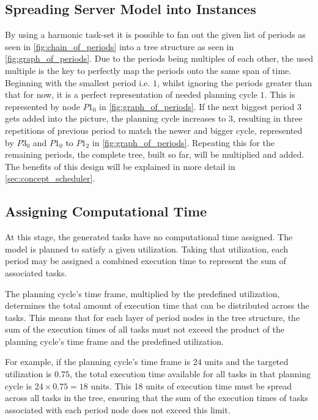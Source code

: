 \subsection{Spreading Server Model into Instances}\label{sec:spreading_server_model_into_instances}
By using a harmonic task-set it is possible to fan out the given list of periods as seen in \cref{fig:chain_of_periods} into a tree structure as seen in \cref{fig:graph_of_periods}.
Due to the periods being multiples of each other, the used multiple is the key to perfectly map the periods onto the same span of time.
Beginning with the smallest period i.e. $1$, whilst ignoring the periods greater than that for now, it is a perfect representation of needed planning cycle $1$.
This is represented by node $P1_0$ in \cref{fig:graph_of_periods}.
If the next biggest period $3$ gets added into the picture, the planning cycle increases to $3$, resulting in three repetitions of previous period to match the newer and bigger cycle, represented by $P3_0$ and $P1_0$ to $P1_2$ in \cref{fig:graph_of_periods}.
Repeating this for the remaining periods, the complete tree, built so far, will be multiplied and added.
The benefits of this design will be explained in more detail in \cref{sec:concept_scheduler}.

\subsection{Assigning Computational Time}\label{sec:concept_load_spread}
At this stage, the generated tasks have no computational time assigned.
The model is planned to satisfy a given utilization.
Taking that utilization, each period may be assigned a combined execution time to represent the sum of associated tasks.

The planning cycle's time frame, multiplied by the predefined utilization, determines the total amount of execution time that can be distributed across the tasks.
This means that for each layer of period nodes in the tree structure, the sum of the execution times of all tasks must not exceed the product of the planning cycle's time frame and the predefined utilization.

For example, if the planning cycle's time frame is $24$ units and the targeted utilization is $0.75$, the total execution time available for all tasks in that planning cycle is \(24 \times 0.75 = 18\) units.
This 18 units of execution time must be spread across all tasks in the tree, ensuring that the sum of the execution times of tasks associated with each period node does not exceed this limit.

